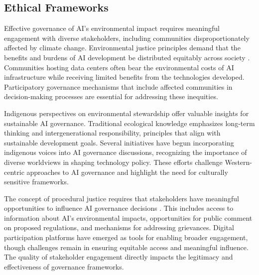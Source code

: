 \documentclass[twoside]{ai_ethics_class}
\begin{document}
\subsection{Ethical Frameworks} %

Effective governance of AI's environmental impact requires meaningful engagement with diverse stakeholders, including communities disproportionately affected by climate change.
Environmental justice principles demand that the benefits and burdens of AI development be distributed equitably across society \cite{jobin2019global}.
Communities hosting data centers often bear the environmental costs of AI infrastructure while receiving limited benefits from the technologies developed.
Participatory governance mechanisms that include affected communities in decision-making processes are essential for addressing these inequities.

Indigenous perspectives on environmental stewardship offer valuable insights for sustainable AI governance.
Traditional ecological knowledge emphasizes long-term thinking and intergenerational responsibility, principles that align with sustainable development goals.
Several initiatives have begun incorporating indigenous voices into AI governance discussions, recognizing the importance of diverse worldviews in shaping technology policy.
These efforts challenge Western-centric approaches to AI governance and highlight the need for culturally sensitive frameworks.

The concept of procedural justice requires that stakeholders have meaningful opportunities to influence AI governance decisions \cite{tyler1988procedural}.
This includes access to information about AI's environmental impacts, opportunities for public comment on proposed regulations, and mechanisms for addressing grievances.
Digital participation platforms have emerged as tools for enabling broader engagement, though challenges remain in ensuring equitable access and meaningful influence.
The quality of stakeholder engagement directly impacts the legitimacy and effectiveness of governance frameworks.


\end{document}
